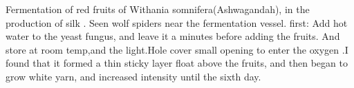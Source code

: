 
Fermentation of red fruits of Withania somnifera(Ashwagandah), in the production of silk .
Seen wolf spiders near the fermentation vessel.
first: Add hot water to the yeast fungus, and leave it a minutes before adding the fruits. And store at room temp,and the light.Hole cover small opening to enter the oxygen .I found that it formed a thin sticky layer float above the fruits, and then began to grow white yarn, and increased intensity until the sixth day.  
